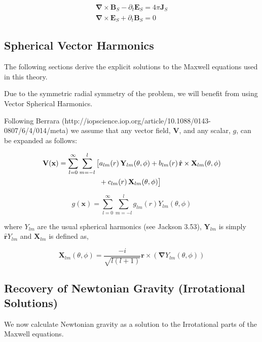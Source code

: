 \documentclass {article}
\renewcommand\vec{\mathbf}
\let\OldS\nabla
\renewcommand{\nabla}{\boldsymbol{\OldS}}
\let\OldHat\hat
\renewcommand{\hat}[1]{\OldHat{\mathbf{#1}}}
\begin{document}
\begin{equation}
\begin{aligned}
\nabla \times \vec B_S - \partial_t \vec E_S =  4 \pi \vec J_S \\
\nabla \times \vec E_S + \partial_t \vec B_S = 0 
\end{aligned}
\end{equation}

\subsection{Spherical Vector Harmonics}

The following sections derive the explicit solutions to the Maxwell equations used in this theory.

Due to the symmetric radial symmetry of the problem, we will benefit from using Vector Spherical Harmonics. 

Following Berrara (http://iopscience.iop.org/article/10.1088/0143-0807/6/4/014/meta) we assume that any vector field, $\vec V$, and any scalar, $g$, can be expanded as follows:



\begin{align}
\vec{V}(\vec{x}) = \sum_{l=0}^{\infty} \sum_{m=-l}^{l} \big[ 
& a_{lm}(r)\, \vec{Y}_{lm}(\theta, \phi) 
+ b_{lm}(r)\, \hat{r} \times \vec{X}_{lm}(\theta, \phi) \notag \\
& + c_{lm}(r)\, \vec{X}_{lm}(\theta, \phi) 
\big]
\end{align}

\begin{equation}
g(\vec x) = \sum_{l=0}^{\infty} \sum_{m=-l}^{l} g_{lm}(r) Y_{lm}(\theta, \phi)
\end{equation}


where $Y_{lm}$ are the usual spherical harmonics (see Jackson 3.53), $\vec Y_{lm}$ is simply $\hat r Y_{lm}$  and $\vec X_{lm}$ is defined as,


\begin{equation}
\vec X_{lm}(\theta, \phi) = \frac {-i}{\sqrt{l(l+1)}} \vec r \times \left( \nabla Y_{lm}(\theta, \phi) \right) 
\label{eq:xlm}
\end{equation}

\subsection{Recovery of Newtonian Gravity (Irrotational Solutions)}

We now calculate Newtonian gravity as a solution to the Irrotational parts of the Maxwell equations.
\end{document}
